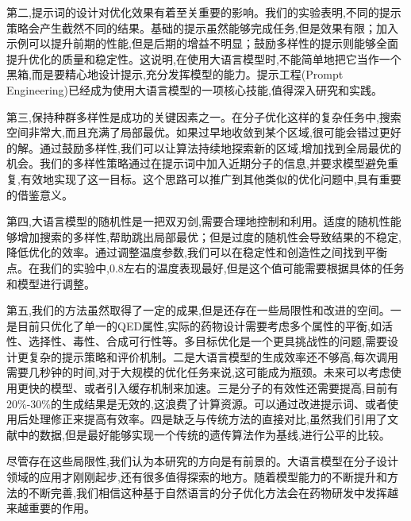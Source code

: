 第二,提示词的设计对优化效果有着至关重要的影响。我们的实验表明,不同的提示策略会产生截然不同的结果。基础的提示虽然能够完成任务,但是效果有限；加入示例可以提升前期的性能,但是后期的增益不明显；鼓励多样性的提示则能够全面提升优化的质量和稳定性。这说明,在使用大语言模型时,不能简单地把它当作一个黑箱,而是要精心地设计提示,充分发挥模型的能力。提示工程(Prompt Engineering)已经成为使用大语言模型的一项核心技能,值得深入研究和实践。

第三,保持种群多样性是成功的关键因素之一。在分子优化这样的复杂任务中,搜索空间非常大,而且充满了局部最优。如果过早地收敛到某个区域,很可能会错过更好的解。通过鼓励多样性,我们可以让算法持续地探索新的区域,增加找到全局最优的机会。我们的多样性策略通过在提示词中加入近期分子的信息,并要求模型避免重复,有效地实现了这一目标。这个思路可以推广到其他类似的优化问题中,具有重要的借鉴意义。

第四,大语言模型的随机性是一把双刃剑,需要合理地控制和利用。适度的随机性能够增加搜索的多样性,帮助跳出局部最优；但是过度的随机性会导致结果的不稳定,降低优化的效率。通过调整温度参数,我们可以在稳定性和创造性之间找到平衡点。在我们的实验中,0.8左右的温度表现最好,但是这个值可能需要根据具体的任务和模型进行调整。

第五,我们的方法虽然取得了一定的成果,但是还存在一些局限性和改进的空间。一是目前只优化了单一的QED属性,实际的药物设计需要考虑多个属性的平衡,如活性、选择性、毒性、合成可行性等。多目标优化是一个更具挑战性的问题,需要设计更复杂的提示策略和评价机制。二是大语言模型的生成效率还不够高,每次调用需要几秒钟的时间,对于大规模的优化任务来说,这可能成为瓶颈。未来可以考虑使用更快的模型、或者引入缓存机制来加速。三是分子的有效性还需要提高,目前有20\%-30\%的生成结果是无效的,这浪费了计算资源。可以通过改进提示词、或者使用后处理修正来提高有效率。四是缺乏与传统方法的直接对比,虽然我们引用了文献中的数据,但是最好能够实现一个传统的遗传算法作为基线,进行公平的比较。

尽管存在这些局限性,我们认为本研究的方向是有前景的。大语言模型在分子设计领域的应用才刚刚起步,还有很多值得探索的地方。随着模型能力的不断提升和方法的不断完善,我们相信这种基于自然语言的分子优化方法会在药物研发中发挥越来越重要的作用。
